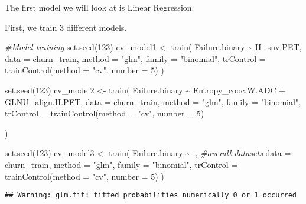 \documentclass[
]{article}
\newenvironment{Shaded}{\begin{snugshade}}{\end{snugshade}}
\newcommand{\AttributeTok}[1]{\textcolor[rgb]{0.77,0.63,0.00}{#1}}
\newcommand{\CommentTok}[1]{\textcolor[rgb]{0.56,0.35,0.01}{\textit{#1}}}
\newcommand{\DecValTok}[1]{\textcolor[rgb]{0.00,0.00,0.81}{#1}}
\newcommand{\FunctionTok}[1]{\textcolor[rgb]{0.00,0.00,0.00}{#1}}
\newcommand{\NormalTok}[1]{#1}
\newcommand{\OtherTok}[1]{\textcolor[rgb]{0.56,0.35,0.01}{#1}}
\newcommand{\SpecialCharTok}[1]{\textcolor[rgb]{0.00,0.00,0.00}{#1}}
\newcommand{\StringTok}[1]{\textcolor[rgb]{0.31,0.60,0.02}{#1}}
\begin{document}
The first model we will look at is Linear Regression.

First, we train 3 different models.

\begin{Shaded}
\begin{Highlighting}[]
\CommentTok{\#Model training}
 \FunctionTok{set.seed}\NormalTok{(}\DecValTok{123}\NormalTok{)}
\NormalTok{ cv\_model1 }\OtherTok{\textless{}{-}} \FunctionTok{train}\NormalTok{(}
\NormalTok{   Failure.binary }\SpecialCharTok{\textasciitilde{}}\NormalTok{ H\_suv.PET, }
   \AttributeTok{data =}\NormalTok{ churn\_train, }
   \AttributeTok{method =} \StringTok{"glm"}\NormalTok{,}
   \AttributeTok{family =} \StringTok{"binomial"}\NormalTok{,}
   \AttributeTok{trControl =} \FunctionTok{trainControl}\NormalTok{(}\AttributeTok{method =} \StringTok{"cv"}\NormalTok{, }\AttributeTok{number =} \DecValTok{5}\NormalTok{)}
\NormalTok{   )}

\FunctionTok{set.seed}\NormalTok{(}\DecValTok{123}\NormalTok{)}
\NormalTok{cv\_model2 }\OtherTok{\textless{}{-}} \FunctionTok{train}\NormalTok{(}
\NormalTok{   Failure.binary }\SpecialCharTok{\textasciitilde{}}\NormalTok{ Entropy\_cooc.W.ADC }\SpecialCharTok{+}\NormalTok{ GLNU\_align.H.PET,}
   \AttributeTok{data =}\NormalTok{ churn\_train,}
   \AttributeTok{method =} \StringTok{"glm"}\NormalTok{,}
   \AttributeTok{family =} \StringTok{"binomial"}\NormalTok{,}
   \AttributeTok{trControl =} \FunctionTok{trainControl}\NormalTok{(}\AttributeTok{method =} \StringTok{"cv"}\NormalTok{, }\AttributeTok{number =} \DecValTok{5}\NormalTok{)}

\NormalTok{ )}

 \FunctionTok{set.seed}\NormalTok{(}\DecValTok{123}\NormalTok{)}
\NormalTok{ cv\_model3 }\OtherTok{\textless{}{-}} \FunctionTok{train}\NormalTok{(}
\NormalTok{   Failure.binary }\SpecialCharTok{\textasciitilde{}}\NormalTok{ .,  }\CommentTok{\#overall datasets}
   \AttributeTok{data =}\NormalTok{ churn\_train,}
   \AttributeTok{method =} \StringTok{"glm"}\NormalTok{,}
   \AttributeTok{family =} \StringTok{"binomial"}\NormalTok{,}
   \AttributeTok{trControl =} \FunctionTok{trainControl}\NormalTok{(}\AttributeTok{method =} \StringTok{"cv"}\NormalTok{, }\AttributeTok{number =} \DecValTok{5}\NormalTok{)}
\NormalTok{ )}
\end{Highlighting}
\end{Shaded}

\begin{verbatim}
## Warning: glm.fit: fitted probabilities numerically 0 or 1 occurred
\end{verbatim}
\end{document}
